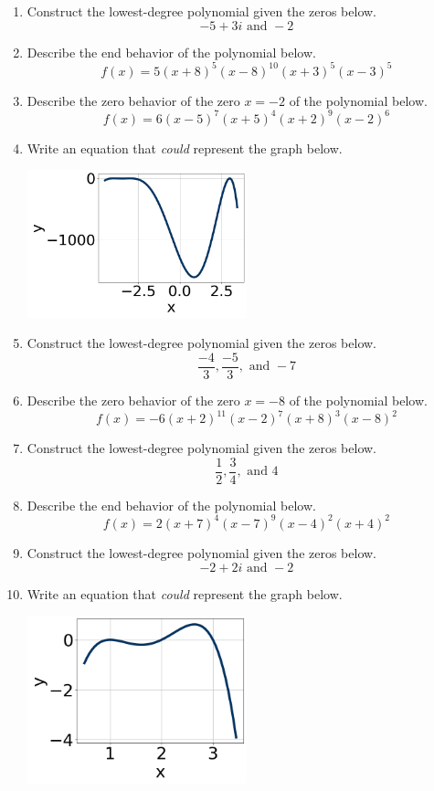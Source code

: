 \documentclass[14pt]{extbook}
\begin{document}
\begin{enumerate}
{\begin{center}
\end{center}
} \newpage
\item{
Construct the lowest-degree polynomial given the zeros below.\[ -5 + 3 i \text{ and } -2 \]} \newpage
\item{
Describe the end behavior of the polynomial below.\[ f(x) = 5(x + 8)^{5}(x - 8)^{10}(x + 3)^{5}(x - 3)^{5} \]} \newpage
\item{
Describe the zero behavior of the zero $x = -2$ of the polynomial below.\[ f(x) = 6(x - 5)^{7}(x + 5)^{4}(x + 2)^{9}(x - 2)^{6} \]} \newpage
\item{
Write an equation that \textit{could} represent the graph below.
\begin{center}
    \includegraphics[width=0.5\textwidth]{../Figures/polyGraphToFunctionB.png}
\end{center}
} \newpage
\item{
Construct the lowest-degree polynomial given the zeros below.\[ \frac{-4}{3}, \frac{-5}{3}, \text{ and } -7 \]} \newpage
\item{
Describe the zero behavior of the zero $x = -8$ of the polynomial below.\[ f(x) = -6(x + 2)^{11}(x - 2)^{7}(x + 8)^{3}(x - 8)^{2} \]} \newpage
\item{
Construct the lowest-degree polynomial given the zeros below.\[ \frac{1}{2}, \frac{3}{4}, \text{ and } 4 \]} \newpage
\item{
Describe the end behavior of the polynomial below.\[ f(x) = 2(x + 7)^{4}(x - 7)^{9}(x - 4)^{2}(x + 4)^{2} \]} \newpage
\item{
Construct the lowest-degree polynomial given the zeros below.\[ -2 + 2 i \text{ and } -2 \]} \newpage
\item{
Write an equation that \textit{could} represent the graph below.
\begin{center}
    \includegraphics[width=0.5\textwidth]{../Figures/polyGraphToFunctionCopyB.png}

\end{center}}
\end{enumerate}
\end{document}
